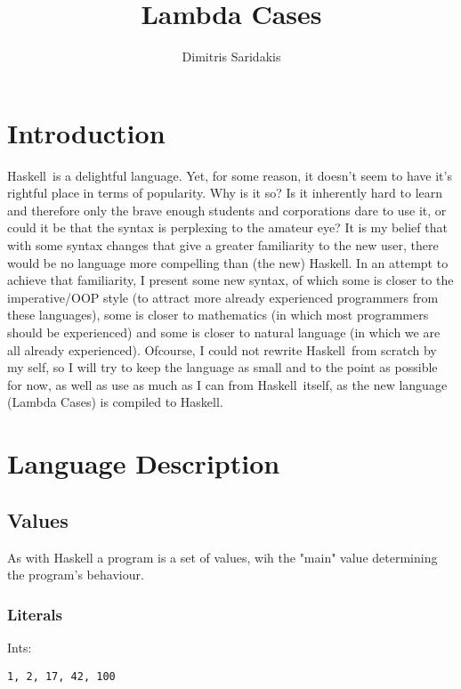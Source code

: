 \documentclass{article}
\date{}
\author{
  Dimitris Saridakis
}
\def\H{Haskell}
\begin{document}
\title{
\textbf{Lambda Cases}
}
\maketitle

\setcounter{tocdepth}{4}
\setcounter{secnumdepth}{4}
\tableofcontents

\section{Introduction}

\H\ is a delightful language. Yet, for some reason, it doesn't seem to have it's 
rightful place in terms of popularity. Why is it so? Is it inherently hard to learn
and therefore only the brave enough students and corporations dare to use it, or
could it be that the syntax is perplexing to the amateur eye? It is my belief that 
with some syntax changes that give a greater familiarity to the new user, there
would be no language more compelling than (the new) \H. In an attempt to achieve
that familiarity, I present some new syntax, of which
some is closer to the imperative/OOP style (to attract more already experienced
programmers from these languages), some is closer to mathematics (in which most 
programmers should be experienced) and some is closer to natural language
(in which we are all already experienced). Ofcourse, I could not rewrite \H\
from scratch by my self, so I will try to keep the language as small and to the 
point as possible for now, as well as use as much as I can from \H\ itself, as 
the new language (Lambda Cases) is compiled to \H.

\section{Language Description}

\subsection{Values}

As with Haskell a program is a set of values, wih the "main" value determining 
the program's behaviour.

\subsubsection{Literals}

Ints:
\begin{verbatim}
1, 2, 17, 42, 100 
\end{verbatim}
\end{document}
